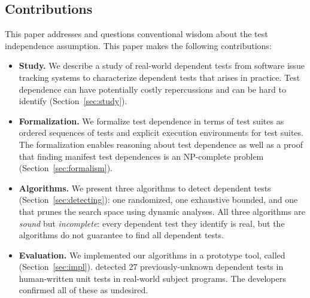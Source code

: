 \subsection{Contributions}
\label{sec:contributions}

This paper addresses and questions
conventional wisdom about the test independence assumption. 
This paper makes the following contributions:

\begin{itemize}

  \item \textbf{Study.} We describe a study of \dtnum real-world
  dependent tests from \repnum software issue tracking
  systems to characterize dependent tests that
  arises in practice.  Test dependence can have
  potentially costly repercussions and can be hard to identify
  (Section~\ref{sec:study}).

\item \textbf{Formalization.} We formalize test dependence
  in terms of test suites as ordered sequences of tests and explicit execution
  environments for test suites.  The formalization enables reasoning about test dependence
  as well as a proof that finding manifest test dependences is an NP-complete
  problem (Section~\ref{sec:formalism}).

  \item \textbf{Algorithms.} We present three algorithms
  to detect dependent tests (Section~\ref{sec:detecting}):
  one randomized, one exhaustive bounded, and one that prunes the search
  space using dynamic analyses.
  All three algorithms are \emph{sound} but \emph{incomplete}:
  every dependent test they identify is real, but the algorithms
  do not guarantee to find all dependent tests. 

  \item \textbf{Evaluation.} We implemented our algorithms in a prototype
  tool, called \ourtool (Section~\ref{sec:impl}).
  \ourtool detected 27 previously-unknown dependent tests in human-written
  unit tests in \subjnum real-world subject programs.
  The developers confirmed all of these as
  undesired.

\end{itemize}




